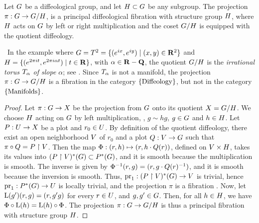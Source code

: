 \begin{article}
  \label{Fibrations-of-groups-by-subgroups}
  Let $G$ be a diffeological group,
  and let $H \subset G$ be any subgroup.
  The projection $\pi : G \to G/H$,
  is a principal diffeological fibration with structure group $H$,
  where $H$ acts on $G$ by left or right multiplication and the coset $G/H$ is equipped with the quotient diffeology.
  
  \Note~In the example where $G = T^2 = \{(e^{ix},e^{iy}) \mid (x,y) \in {\mathbf R}^2 \}$ and $H = \{(e^{2\pi i t},e^{2\pi i \alpha t}) \mid t \in {\mathbf R}\}$,
  with $\alpha \in {\mathbf R} - {\mathbf Q}$,
  the quotient $G/H$ is the {\em irrational torus $T_\alpha$ of slope $\alpha$};
  see .
  Since $T_\alpha$ is not a manifold,
  the projection $\pi : G \to G/H$ is a fibration in the category $\{\operatorname{Diffeology}\}$,
  but not in the category $\{\operatorname{Manifolds}\}$.
\end{article} %

\begin{proof}
  Let $\pi : G \to X$ be the projection from $G$ onto its quotient $X = G/H$.
  We choose $H$ acting on $G$ by left multiplication,
  \ie,
  $g \sim hg$, $g \in G$ and $h \in H$.
  Let $P : U \to X$ be a plot and $r_0 \in U$.
  By definition of the quotient diffeology,
  there exist an open neighborhood $V$ of $r_0$ and a plot $Q : V \to G$ such that $\pi \circ Q = P \restriction V$.
  Then the map $\Phi : (r,h) \mapsto (r,h \cdot Q(r))$,
  defined on $V \times H$,
  takes its values into $(P\restriction V)^*(G) \subset P^*(G)$,
  and it is smooth because the multiplication is smooth.
  The inverse is given by $\Phi^{-1}(r,g) = (r, g \cdot Q(r)^{-1})$,
  and it is smooth because the inversion is smooth.
  Thus,
  $\mathrm{pr}_1 : (P\restriction V)^*(G) \to V$ is trivial,
  hence $\mathrm{pr}_1 : P^*(G) \to U$ is locally trivial,
  and the projection $\pi$ is a fibration .
  Now,
  let $\mathrm{L}(g')(r,g) = (r,g'g)$ for every $r \in U$,
  and $g,g' \in G$.
  Then,
  for all $h \in H$,
  we have $\Phi \circ \mathrm{L}(h) = \mathrm{L}(h) \circ \Phi$.
  The projection $\pi : G \to \hbox{$G$}\hbox{$/$}\hbox{$H$}$ is thus a principal fibration with structure group $H$.
\end{proof}

